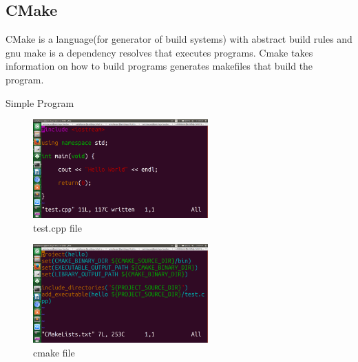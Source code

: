 \subsection{CMake}

CMake is a language(for generator of build systems) with abstract build rules and gnu make is a dependency resolves that executes programs. Cmake takes information on how to build programs generates makefiles that build the program. 

Simple Program 

\begin{figure}[!ht]
\centering
\includegraphics[width=0.6\textwidth]{input/images/cgs/hello.png}                   
\caption{test.cpp file}
\hspace{-1.5em}
\end{figure}

\begin{figure}[!ht]
\centering
\includegraphics[width=0.6\textwidth]{input/images/cgs/cm.png}                   
\caption{cmake file}
\hspace{-1.5em}
\end{figure}

